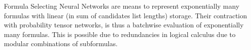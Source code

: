 %
%
%




Formula Selecting Neural Networks are means to represent exponentially many formulas with linear (in sum of candidates list lengths) storage.
Their contraction with probability tensor networks, is thus a batchwise evaluation of exponentially many formulas.
This is possible due to redundancies in logical calculus due to modular combinations of subformulas.

